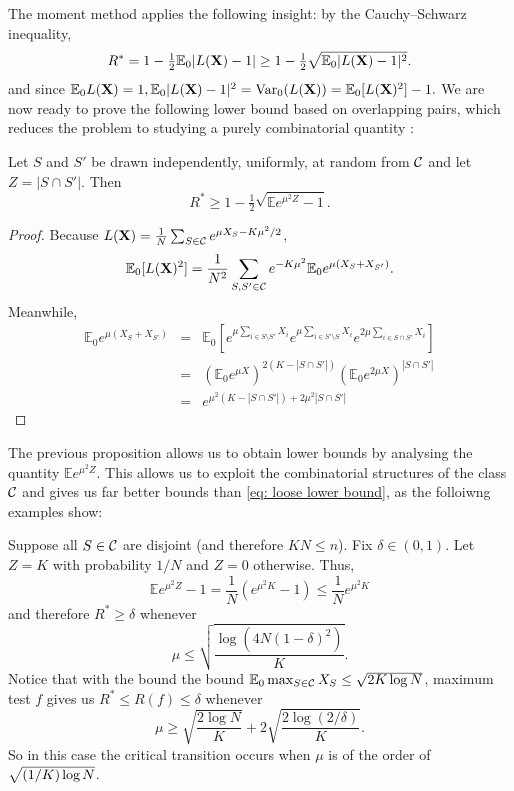 \documentclass[10pt, oneside]{article}
\begin{document}
The moment method applies the following insight: by the Cauchy--Schwarz inequality,
%
\[
R^* = 1 - \tfrac{1}{2} \mathbb{E}_0 |L(\mathbf{X})-1|
\ge1 - \tfrac{1}{2} \sqrt{\mathbb{E}_0 |L(\mathbf{X})-1|^2}.
\]
and since $\mathbb{E}_0 L(\mathbf{X}) = 1, \mathbb{E}_0 |L(\mathbf{X})-1|^2=\operatorname{Var}_0(L(\mathbf{X})) = \mathbb{E}_0 [L(\mathbf{X})^2] -1.$ 
We are now ready to prove the following lower bound based on overlapping pairs, which reduces the problem to
studying a purely combinatorial quantity \cite{arias2008searching,addario2010combinatorial}:
\begin{prop}
  \label{prop:pairs}
  Let $S$ and $S'$ be drawn independently, uniformly, at random from ${\mathcal C}$
  and let $Z=|S\cap S'|$. Then
  \[
  R^* \ge 1- \tfrac{1}{2} \sqrt{\mathbb{E} e^{\mu^2 Z} -1}.
  \]
\end{prop}
\begin{proof}
Because $L(\mathbf{X})= \frac1 N \sum_{S\in{\mathcal C}} e^{\mu X_S -K\mu^2/2}$, 
\[
\mathbb{E}_0 [L(\mathbf{X})^2]
=
\frac{1}{N^2} \sum_{S,S'\in{\mathcal C}} e^{-K \mu^2} \mathbb{E}_0 e^{\mu(X_S+X_{S'})}.
\]
Meanwhile,
\begin{eqnarray*}
\mathbb{E}_0 e^{\mu(X_S+X_{S'})}
& = &
\mathbb{E}_0 [ e^{\mu\sum_{i\in S\setminus S'} X_i} e^{\mu\sum_{i\in
S'\setminus S} X_i}
e^{2\mu\sum_{i\in S\cap S'} X_i} ] \\
& = &
(\mathbb{E}_0 e^{\mu X} )^{2(K-|S\cap S'|)} (\mathbb{E}_0 e^{2\mu X}
)^{|S\cap S'|}
\\
& = &
e^{\mu^2 (K-|S\cap S'|)+2\mu^2|S\cap S'|}
\end{eqnarray*}
\end{proof}

The previous proposition allows us to obtain lower bounds by analysing the quantity $\mathbb{E} e^{\mu^2Z}$. 
This allows us to exploit the combinatorial structures of the class ${\mathcal C}$ and gives us far better bounds than \ref{eq: loose lower bound}, as the folloiwng examples show:


\begin{exmp}
  \label{exmp: Disjoint Sets}
  Suppose all $S\in{\mathcal C}$ are disjoint (and therefore $KN\le n$). Fix $\delta\in(0,1)$. Let $Z = K$ with probability $1/N$ and $Z = 0$ otherwise. Thus,
  \[
  \mathbb{E} e^{\mu^2Z} -1 = \frac{1}{N} (e^{\mu^2 K} -1 )
  \le\frac{1}{N} e^{\mu^2 K}
  \]
  and therefore $R^* \ge\delta$ whenever
  \[
  \mu\le\sqrt{\frac{\log(4N(1-\delta)^2)}{K}}.
  \]
  Notice that with the bound the bound $\mathbb{E}_0 \max_{S\in{\mathcal C}} X_S \le\sqrt{2K\log N}$, maximum test $f$ gives us $R^* \le R(f) \le\delta$
  whenever
  \[
  \mu\ge\sqrt{\frac{2\log N}{K}} + 2\sqrt{\frac{2\log(2/\delta)}{K}}.
  \]
  So in this case the critical transition occurs when $\mu$ is of the order
of $\hspace*{-0.2pt}\sqrt{(1/K)\hspace*{-0.2pt}\log\hspace*{-0.25pt} N}$.
\end{exmp}
\end{document}
